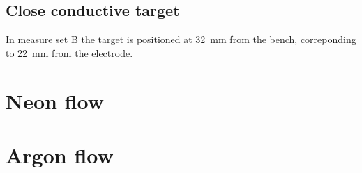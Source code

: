 \subsection{Close conductive target}
In measure set B the target is positioned at \SI{32}{\milli\meter} from the bench, correponding to \SI{22}{\milli\meter} from the electrode.

\section{Neon flow}


\section{Argon flow}








